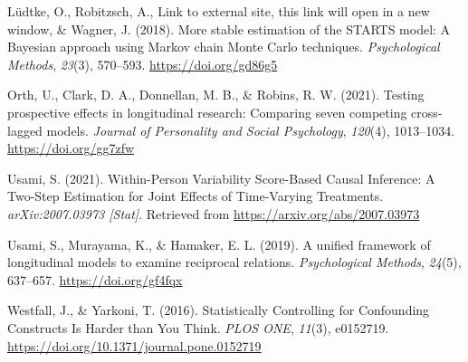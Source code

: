 \documentclass[
  english,
  man,floatsintext]{apa6}
\newlength{\cslhangindent}
\newlength{\cslentryspacingunit} %
\newenvironment{CSLReferences}[2] %
 {%
  \setlength{\parindent}{0pt}
  \ifodd #1
  \let\oldpar\par
  \def\par{\hangindent=\cslhangindent\oldpar}
  \fi
  \setlength{\parskip}{#2\cslentryspacingunit}
 }%
 {}
\begin{document}
\begin{CSLReferences}{1}{0}
\leavevmode{}%
Lüdtke, O., Robitzsch, A., Link to external site, this link will open in a new window, \& Wagner, J. (2018). More stable estimation of the {STARTS} model: {A Bayesian} approach using {Markov} chain {Monte Carlo} techniques. \emph{Psychological Methods}, \emph{23}(3), 570--593. \url{https://doi.org/gd86g5}

\leavevmode{}%
Orth, U., Clark, D. A., Donnellan, M. B., \& Robins, R. W. (2021). Testing prospective effects in longitudinal research: {Comparing} seven competing cross-lagged models. \emph{Journal of Personality and Social Psychology}, \emph{120}(4), 1013--1034. \url{https://doi.org/gg7zfw}

\leavevmode{}%
Usami, S. (2021). Within-{Person Variability Score-Based Causal Inference}: {A Two-Step Estimation} for {Joint Effects} of {Time-Varying Treatments}. \emph{arXiv:2007.03973 {[}Stat{]}}. Retrieved from \url{https://arxiv.org/abs/2007.03973}

\leavevmode{}%
Usami, S., Murayama, K., \& Hamaker, E. L. (2019). A unified framework of longitudinal models to examine reciprocal relations. \emph{Psychological Methods}, \emph{24}(5), 637--657. \url{https://doi.org/gf4fqx}

\leavevmode{}%
Westfall, J., \& Yarkoni, T. (2016). Statistically {Controlling} for {Confounding Constructs Is Harder} than {You Think}. \emph{PLOS ONE}, \emph{11}(3), e0152719. \url{https://doi.org/10.1371/journal.pone.0152719}

\end{CSLReferences}
\end{document}
